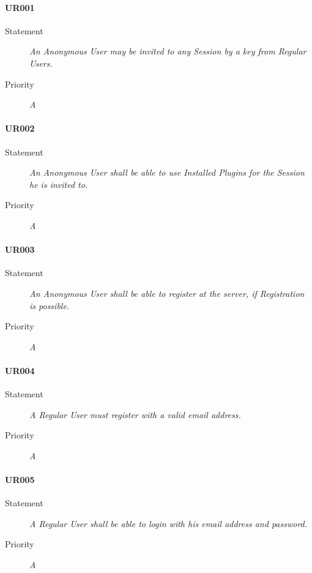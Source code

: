 \paragraph*{UR001}
\begin{description}
  \item [Statement] 
    \textit{An \gls{Anonymous User} may be invited to any \gls{Session} by a key from \gls{Regular User}s.}
  \item [Priority] \textit{A}
\end{description}

\paragraph*{UR002}
\begin{description}
  \item [Statement] 
    \textit{An \gls{Anonymous User} shall be able to use \gls{Installed Plugins} for the \gls{Session} he is invited to.}
  \item [Priority] \textit{A}
\end{description}

\paragraph*{UR003}
\begin{description}
  \item [Statement] 
    \textit{An \gls{Anonymous User} shall be able to register at the server, if \gls{Registration} is possible.}
  \item [Priority] \textit{A}
\end{description}

\paragraph*{UR004}
\begin{description}
  \item [Statement] 
    \textit{A \gls{Regular User} must register with a valid email address.}
  \item [Priority] \textit{A}
\end{description}

\paragraph*{UR005}
\begin{description}
  \item [Statement] 
    \textit{A \gls{Regular User} shall be able to login with his email address and password.}
  \item [Priority] \textit{A}
\end{description}


